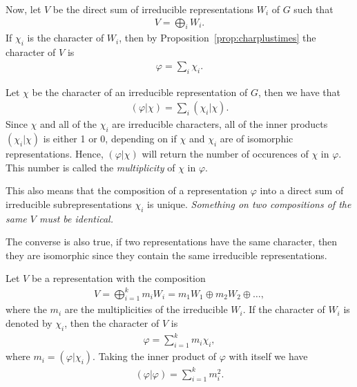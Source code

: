 Now, let $V$ be the direct sum of irreducible representations $W_i$ of $G$ such that
\begin{align*}
	V = \bigoplus_i W_i.
\end{align*}
If $\chi_i$ is the character of $W_i$, then by Proposition~\ref{prop:charplustimes} the character of $V$ is
\begin{align*}
	\varphi = \sum_i \chi_i.
\end{align*}

Let $\chi$ be the character of an irreducible representation of $G$, then we have that
\begin{align*}
	(\varphi|\chi) = \sum_i (\chi_i|\chi).
\end{align*}
Since $\chi$ and all of the $\chi_i$ are irreducible characters, all of the inner products $(\chi_i|\chi)$ is either 1 or 0, depending on if $\chi$ and $\chi_i$ are of isomorphic representations. Hence, $(\varphi|\chi)$ will return the number of occurences of $\chi$ in $\varphi$. This number is called the \textit{multiplicity} of $\chi$ in $\varphi$.

\begin{remark}
	This also means that the composition of a representation $\varphi$ into a direct sum of irreducible subrepresentations $\chi_i$ is unique. \textit{Something on two compositions of the same $V$ must be identical.}
\end{remark}

\begin{remark}
	The converse is also true, if two representations have the same character, then they are isomorphic since they contain the same irreducible representations.
\end{remark}

\begin{note}
	Let $V$ be a representation with the composition 
	\begin{align*}
		V = \bigoplus_{i=1}^k m_i W_i = m_1W_1 \oplus m_2W_2 \oplus \dots,
	\end{align*}
	where the $m_i$ are the multiplicities of the irreducible $W_i$. If the character of $W_i$ is denoted by $\chi_i$, then the character of $V$ is
	\begin{align*}
		\varphi = \sum_{i=1}^k m_i \chi_i,
	\end{align*}
	where $m_i = (\varphi|\chi_i)$.	Taking the inner product of $\varphi$ with itself we have
	\begin{align}\label{eq:innerprodself}
		(\varphi|\varphi) = \sum_{i=1}^k m_i^2.
	\end{align}
\end{note}

